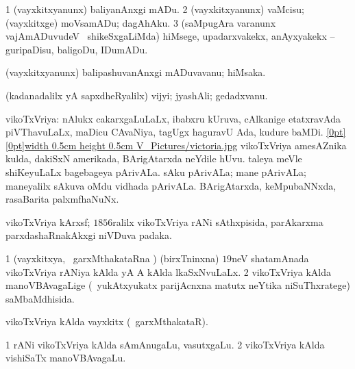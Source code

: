 {{{{{\bentry
{} 
\gl{\sakirx}
\expl{}
\bmng
\bnum
\num{1} (vayxkitxyanunx) baliyanAnxgi mADu. 
\num{2} (vayxkitxyanunx) vaMcisu; (vayxkitxge) moVsamADu; dagAhAku. 
\num{3} (saMpugAra \mo varanunx vajAmADuvudeV \mo\ shikeSxgaLiMda) hiMsege, upadarxvakekx, anAyxyakekx -- guripaDisu, baligoDu, IDumADu. 
\enum
\emng
\eentry

\bentry
{} 
\gl{\nA}
\expl{}
\bmng
 (vayxkitxyanunx) balipashuvanAnxgi mADuvavanu; hiMsaka. 
\emng
\eentry

\bentry
{} 
\gl{\nA}
\expl{}
\bmng
 (kadanadalilx yA sapxdheRyalilx) vijyi; jyashAli; gedadxvanu. 
\emng
\eentry

\bentry
{} 
\gl{\nA}
\expl{}
\bmng
 vikoTxVriya: 
\banum
{} nAlukx cakarxgaLuLaLx, ibabxru kUruva, cAlkanige etatxravAda piVThavuLaLx, maDicu CAvaNiya, tagUgx haguravU Ada, kudure baMDi. \quad \hyperlink{victoriafigure}{\raisebox{-0.15cm}[0pt][0pt]{\pdfimage width 0.5cm height 0.5cm {V_Pictures/victoria.jpg}}} 
 vikoTxVriya amesAZnika kulda, dakiSxN amerikada, BArigAtarxda neYdile hUvu. 
 taleya meVle shiKeyuLaLx bagebageya pArivALa. 
 sAku pArivALa; mane pArivALa; maneyalilx sAkuva oMdu vidhada pArivALa. 
\hypertarget{victoria(e)}{} 
 BArigAtarxda, keMpubaNNxda, rasaBarita palxmfhaNuNx. 
\eanum
\emng
\eentry

\bentry
{}
\gl{\nA}
\expl{}
\bmng
 vikoTxVriya kArxsf; $1856$ralilx vikoTxVriya rANi sAthxpisida, parAkarxma parxdashaRnakAkxgi niVDuva padaka. 
\emng
\eentry

\bentry
{} 
\gl{\gu}
\expl{}
\bmng
\bnum
\num{1} (vayxkitxya, \kanmu\ garxMthakataRna \vi) (birxTninxna) $19$neV shatamAnada vikoTxVriya rANiya kAlda yA A kAlda lkaSxNvuLaLx. 
\num{2} vikoTxVriya kAlda manoVBAvagaLige (\kanmu\ yukAtxyukatx parijAcnxna matutx neYtika niSuThxratege) saMbaMdhisida. 
\enum
\emng
\eentry

\bentry
{} 
\gl{\nA}
\expl{}
\bmng
 vikoTxVriya kAlda vayxkitx (\kanmu\ garxMthakataR). 
\emng
\eentry

\bentry
{} 
\gl{\nA}
\expl{(\bava)}
\bmng
\bnum
\num{1} rANi vikoTxVriya kAlda sAmAnugaLu, vasutxgaLu. 
\num{2} vikoTxVriya kAlda vishiSaTx manoVBAvagaLu. 
\enum
\emng
\eentry

}}}}}
